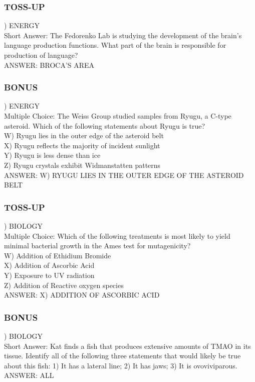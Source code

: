 \documentclass{article}
\begin{document}
\newpage

\subsubsection*{TOSS-UP}
) ENERGY \\
Short Answer: The Fedorenko Lab is studying the development of the brain's language production functions. What part of the brain is responsible for production of language? \\
ANSWER: BROCA'S AREA

\subsubsection*{BONUS}
) ENERGY \\
Multiple Choice: The Weiss Group studied samples from Ryugu, a C-type asteroid. Which of the following statements about Ryugu is true? \\
W) Ryugu lies in the outer edge of the asteroid belt \\
X) Ryugu reflects the majority of incident sunlight \\
Y) Ryugu is less dense than ice \\
Z) Ryugu crystals exhibit Widmanstatten patterns \\
ANSWER: W) RYUGU LIES IN THE OUTER EDGE OF THE ASTEROID BELT

\subsubsection*{TOSS-UP}
) BIOLOGY \\
Multiple Choice: Which of the following treatments is most likely to yield minimal bacterial growth in the Ames test for mutagenicity? \\
W) Addition of Ethidium Bromide \\
X) Addition of Ascorbic Acid \\
Y) Exposure to UV radiation \\
Z) Addition of Reactive oxygen species \\
ANSWER: X) ADDITION OF ASCORBIC ACID

\subsubsection*{BONUS}
) BIOLOGY \\
Short Answer: Kat finds a fish that produces extensive amounts of TMAO in its tissue. Identify all of the following three statements that would likely be true about this fish: 1) It has a lateral line; 2) It has jaws; 3) It is ovoviviparous. \\
ANSWER: ALL
\end{document}
